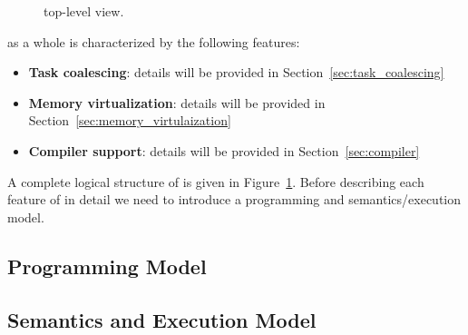 \begin{figure}
	\centering
	\caption{\sys top-level view.}
	\label{fig:system_overview}
\end{figure}

\sys as a whole is characterized by the following features:

\begin{itemize}
	\item \textbf{Task coalescing}: details will be provided in Section~\ref{sec:task_coalescing}
	\item \textbf{Memory virtualization}: details will be provided in Section~\ref{sec:memory_virtulaization}
	\item \textbf{Compiler support}: details will be provided in Section~\ref{sec:compiler}
\end{itemize}

A complete logical structure of \sys is given in Figure~\ref{fig:system_overview}. Before describing each feature of \sys in detail we need to introduce a programming and semantics/execution model.

\subsection{Programming Model}
\label{sec:overview_programming_model}



\subsection{Semantics and Execution Model}
\label{sec:overview_semantics}

